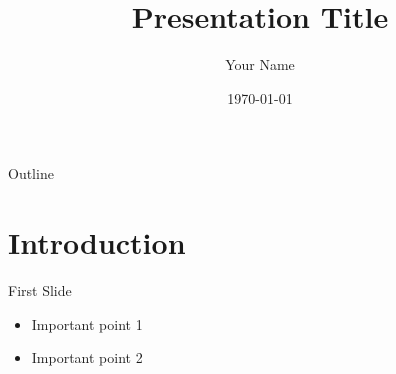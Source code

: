 \documentclass{beamer}
\title{Presentation Title}
\author{Your Name}
\date{\today}
\begin{document}
\frame{\titlepage}

\begin{frame}{Outline}
    \tableofcontents
\end{frame}

\section{Introduction}
\begin{frame}{First Slide}
    \begin{itemize}
        \item Important point 1
        \item Important point 2
    \end{itemize}
\end{frame}
\end{document}
